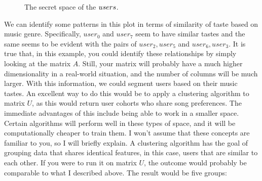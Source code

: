 \documentclass[a4,12pt,twosided,openany]{memoir}
\begin{document}
\begin{figure}[h!]
\begin{center}
\end{center}
\caption{The secret space of the $\protect users$.}
\end{figure}

We can identify some patterns in this plot in terms of similarity of taste based on music genre. Specifically,  $user_0$ and $user_7$ seem to have similar tastes and the same seems to be evident with the pairs of $user_2,user_5$ and $user_6,user_3$. It is true that, in this example, you could identify these relationships by simply looking at the matrix $A$. Still, your matrix will probably have a much higher dimensionality in a real-world situation, and the number of columns will be much larger. With this information, we could segment users based on their music tastes. An excellent way to do this would be to apply a clustering algorithm to matrix $U$, as this would return user cohorts who share song preferences. The immediate advantages of this include being able to work in a smaller space. Certain algorithms will perform well in these types of space, and it will be computationally cheaper to train them. I won’t assume that these concepts are familiar to you, so I will briefly explain. A clustering algorithm has the goal of grouping data that shares identical features, in this case, users that are similar to each other. If you were to run it on matrix $U$, the outcome would probably be comparable to what I described above. The result would be five groups:
\end{document}
